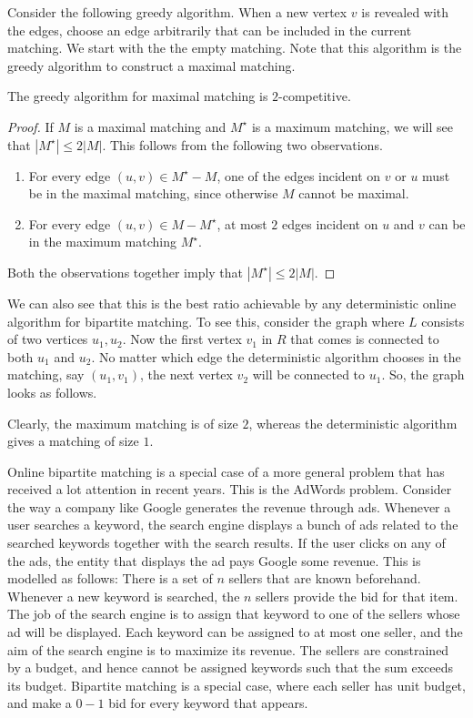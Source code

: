 Consider the following greedy algorithm. When a new vertex $v$ is revealed with the edges, choose an edge arbitrarily that can be included in the current matching. We start with the the empty matching. Note that this algorithm is the greedy algorithm to construct a maximal matching.

\begin{theorem}
	The greedy algorithm for maximal matching is $2$-competitive.
	\label{thm:maximal}
\end{theorem}
\begin{proof}
	If $M$ is a maximal matching and $M^\star$ is a maximum matching, we will see that $|M^\star| \leq 2|M|$. This follows from the following two observations.
	\begin{enumerate}
		\item For every edge $(u,v) \in M^\star - M$, one of the edges incident on $v$ or $u$ must be in the maximal matching, since otherwise $M$ cannot be maximal.
		\item For every edge $(u,v) \in M - M^\star$, at most $2$ edges incident on $u$ and $v$ can be in the maximum matching $M^\star$.
	\end{enumerate}
	Both the observations together imply that $|M^\star| \leq 2|M|$.
\end{proof}

We can also see that this is the best ratio achievable by any deterministic online algorithm for bipartite matching. To see this, consider the graph where $L$ consists of two vertices $u_1, u_2$. Now the first vertex $v_1$ in $R$ that comes is connected to both $u_1$ and $u_2$. No matter which edge the deterministic algorithm chooses in the matching, say $(u_1, v_1)$, the next vertex $v_2$ will be connected to $u_1$. So, the graph looks as follows.

Clearly, the maximum matching is of size $2$, whereas the deterministic algorithm gives a matching of size $1$.

Online bipartite matching is a special case of a more general problem that has received a lot attention in recent years. This is the AdWords problem. Consider the way a company like Google generates the revenue through ads. Whenever a user searches a keyword, the search engine displays a bunch of ads related to the searched keywords together with the search results. If the user clicks on any of the ads, the entity that displays the ad pays Google some revenue. This is modelled as follows: There is a set of $n$ sellers that are known beforehand. Whenever a new keyword is searched, the $n$ sellers provide the bid for that item. The job of the search engine is to assign that keyword to one of the sellers whose ad will be displayed. Each keyword can be assigned to at most one seller, and the aim of the search engine is to maximize its revenue. The sellers are constrained by a budget, and hence cannot be assigned keywords such that the sum exceeds its budget. Bipartite matching is a special case, where each seller has unit budget, and make a $0-1$ bid for every keyword that appears.

